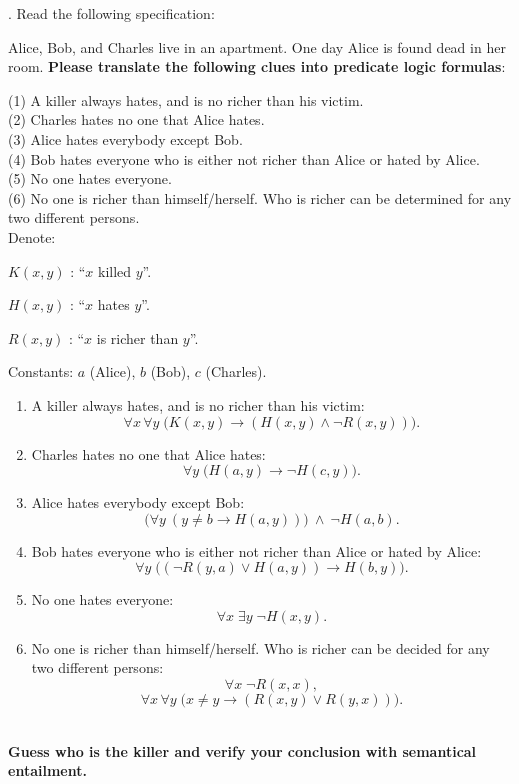 \documentclass{article}
\begin{document}
\maketitle
. Read the following specification: 

Alice, Bob, and Charles live in an apartment. One day Alice is found dead in her room. \textbf{Please translate the following clues into predicate logic formulas}:

\noindent (1) A killer always hates, and is no richer than his victim. \\
(2) Charles hates no one that Alice hates. \\
(3) Alice hates everybody except Bob. \\
(4) Bob hates everyone who is either not richer than Alice or hated by Alice. \\
(5) No one hates everyone. \\
(6) No one is richer than himself/herself. Who is richer can be determined for any two different persons. 
\\[1em]
Denote:

$K(x,y)$ : ``$x$ killed $y$''.

$H(x,y)$ : ``$x$ hates $y$''.

$R(x,y)$ : ``$x$ is richer than $y$''.

Constants: $a$ (Alice), $b$ (Bob), $c$ (Charles).


\begin{enumerate}[label=(\arabic*), noitemsep]
    \item A killer always hates, and is no richer than his victim:
    \[
        \forall x\,\forall y\;\bigl(K(x,y) \rightarrow (H(x,y) \land \neg R(x,y))\bigr).
    \]

    \item Charles hates no one that Alice hates:
    \[
        \forall y\;\bigl(H(a,y) \rightarrow \neg H(c,y)\bigr).
    \]

    \item Alice hates everybody except Bob:
    \[
        \bigl(\forall y\ (y \neq b \rightarrow H(a,y))\bigr)\ \land\ \neg H(a,b).
    \]

    \item Bob hates everyone who is either not richer than Alice or hated by Alice:
    \[
        \forall y\;\bigl((\neg R(y,a) \lor H(a,y)) \rightarrow H(b,y)\bigr).
    \]

    \item No one hates everyone:
    \[
        \forall x\;\exists y\;\neg H(x,y).
    \]

    \item No one is richer than himself/herself.  
    Who is richer can be decided for any two different persons:
    \[
        \forall x\;\neg R(x,x),
    \]
    \[
        \forall x\,\forall y\;\bigl(x \neq y \rightarrow (R(x,y) \lor R(y,x))\bigr).
    \]
\end{enumerate}
~\\[1em]
\noindent \textbf{Guess who is the killer and verify your conclusion with semantical entailment.}
\\[1em]
\end{document}
